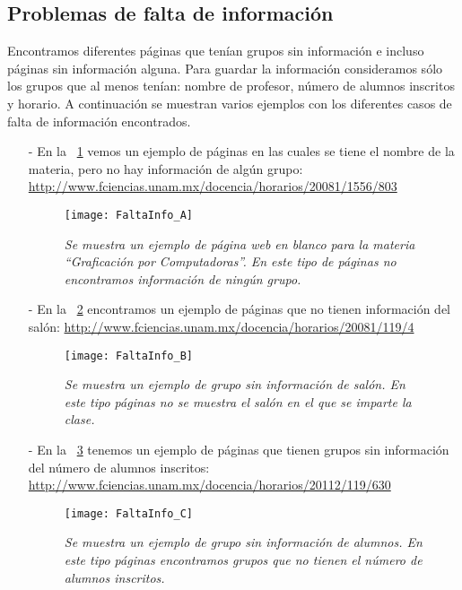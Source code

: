\subsection{Problemas de falta de información}

Encontramos diferentes páginas que tenían grupos sin información e incluso páginas sin información alguna. Para guardar la información consideramos sólo los grupos que al menos tenían: nombre de profesor, número de alumnos inscritos y horario. A continuación se muestran varios ejemplos con los diferentes casos de falta de información encontrados.


\begin{itemize}
\item[-] En la \figurename{~\ref{pagEnBlanco}} vemos un ejemplo de páginas en las cuales se tiene el nombre de la materia, pero no hay información de algún grupo: \url{http://www.fciencias.unam.mx/docencia/horarios/20081/1556/803}

\begin{figure}[H]
\centering
\texttt{[image: FaltaInfo\_A]} %
\caption[\textit{Ejemplo de página web en blanco}]{\textit{Se muestra un ejemplo de página web en blanco para la materia ``Graficación por Computadoras''. En este tipo de páginas no encontramos información de ningún grupo.}}\label{pagEnBlanco}
\end{figure}

\item[-] En la \figurename{~\ref{GpoSinInfo}} encontramos un ejemplo de páginas que no tienen información del salón: \url{http://www.fciencias.unam.mx/docencia/horarios/20081/119/4}

\begin{figure}[H]
\centering
\texttt{[image: FaltaInfo\_B]} %
\caption[\textit{Ejemplo de grupo sin información de salón}]{\textit{Se muestra un ejemplo de grupo sin información de salón. En este tipo páginas no se muestra el salón en el que se imparte la clase.}}\label{GpoSinInfo}
\end{figure}

\item[-] En la \figurename{~\ref{GpoSinAlumnos}} tenemos un ejemplo de páginas que tienen grupos sin información del número de alumnos inscritos: \url{http://www.fciencias.unam.mx/docencia/horarios/20112/119/630}

\begin{figure}[H]
\centering
\texttt{[image: FaltaInfo\_C]} %
\caption[\textit{Ejemplo de grupo sin información de alumnos}]{\textit{Se muestra un ejemplo de grupo sin información de alumnos. En este tipo páginas encontramos grupos que no tienen el número de alumnos inscritos.}}\label{GpoSinAlumnos}
\end{figure}


\end{itemize}
